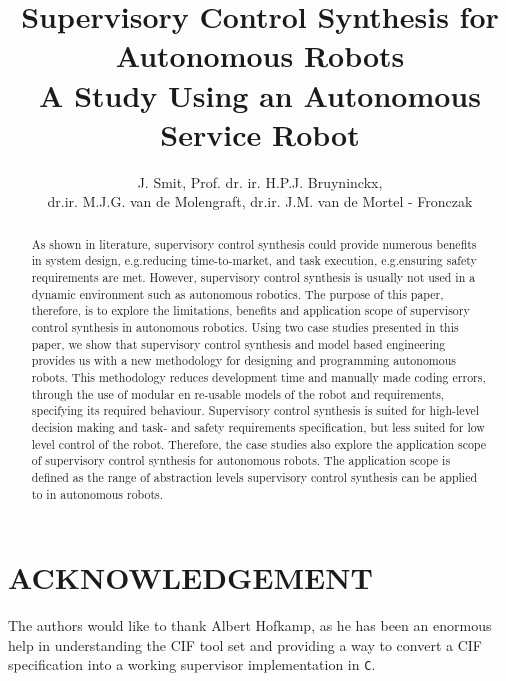 \documentclass[a4paper, 10pt, conference]{IEEEtran}      %
\title{\LARGE \bf 
Supervisory Control Synthesis for Autonomous Robots\\
\large A Study Using an Autonomous Service Robot}
\author{J. Smit, Prof. dr. ir. H.P.J. Bruyninckx,\\dr.ir. M.J.G. van de Molengraft,  
dr.ir. J.M. van de Mortel - Fronczak}%
\begin{document}
\graphicspath{{./images/}}

\maketitle
\thispagestyle{plain}
\pagestyle{plain}

\begin{abstract}

As shown in literature, supervisory control synthesis could provide numerous benefits in system design, e.g.\@ reducing time-to-market, and task execution, e.g.\@ ensuring safety requirements are met. 
However, supervisory control synthesis is usually not used in a dynamic environment such as autonomous robotics. 
The purpose of this paper, therefore, is to explore the limitations, benefits and application scope of supervisory control synthesis in autonomous robotics.
Using two case studies presented in this paper, we show that supervisory control synthesis and model based engineering provides us with a new methodology for designing and programming autonomous robots. 
This methodology reduces development time and manually made coding errors, through the use of modular en re-usable models of the robot and requirements, specifying its required behaviour.
Supervisory control synthesis is suited for high-level decision making and task- and safety requirements specification, but less suited for low level control of the robot.
Therefore, the case studies also explore the application scope of supervisory control synthesis for autonomous robots.
The application scope is defined as the range of abstraction levels supervisory control synthesis can be applied to in autonomous robots.\\

\end{abstract}








\section*{ACKNOWLEDGEMENT} The authors would like to thank Albert Hofkamp, as he has been an enormous help in understanding the CIF tool set and providing a way to convert a CIF specification into a working supervisor implementation in \texttt{C}.\\
\printbibliography{} 
\newpage
\appendices

\newpage

\end{document}
